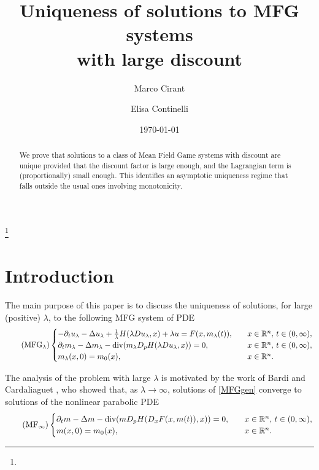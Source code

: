 \documentclass{amsart}
\theoremstyle{remark}
\theoremstyle{definition}
\theoremstyle{Claim}
\theoremstyle{plain}
\begin{document}
\title[]{Uniqueness of solutions to MFG systems \\ with large discount}

\author{Marco Cirant}
\address{Dipartimento di Matematica ``Tullio Levi-Civita'', Universit\`a degli Studi di Padova, 
via Trieste 63, 35121 Padova (Italy)}
\curraddr{}
\thanks{}
\author{Elisa Continelli}
\address{Dipartimento di Matematica ``Tullio Levi-Civita'', Universit\`a degli Studi di Padova, 
via Trieste 63, 35121 Padova (Italy)}
\curraddr{}

\date{\today}

\begin{abstract} We prove that solutions to a class of Mean Field Game systems with discount are unique provided that the discount factor is large enough, and the Lagrangian term is (proportionally) small enough. This identifies an asymptotic uniqueness regime that falls outside the usual ones involving monotonicity.
\end{abstract}

\maketitle


\section{Introduction}

	The main purpose of this paper is to discuss the uniqueness of solutions, for large (positive) $\lambda$, to the following MFG system of PDE
	\begin{equation}\label{MFGgen}\tag{${\rm MFG}_\lambda$}
		\begin{cases}
			-\partial_t u_\lambda-\Delta u_\lambda+\frac{1}{\lambda}H(\lambda Du_\lambda,x)+\lambda u=F(x,m_\lambda(t)),\quad &x\in \mathbb{R}^n,\,t\in (0,\infty),\\
			\partial_t m_\lambda-\Delta m_\lambda-\text{div}(m_\lambda D_pH(\lambda Du_\lambda,x))=0,\quad &x\in \mathbb{R}^n,\,t\in (0,\infty),\\
			m_\lambda(x,0)=m_0(x),\quad &x\in \mathbb{R}^n. %
		\end{cases}
	\end{equation}
	
	The analysis of the problem with large $\lambda$ is motivated by the work of Bardi and Cardaliaguet \cite{BC}, who showed that, as $\lambda \to \infty$, solutions of \eqref{MFGgen} converge to solutions of the nonlinear parabolic PDE
	\begin{equation}\label{MFGlim}\tag{${\rm MF}_\infty$}
		\begin{cases}
			\partial_t m-\Delta m-\text{div}(mD_pH(D_x F(x,m(t)),x))=0,\quad &x\in \mathbb{R}^n,\,t\in (0,\infty),\\
			m(x,0)=m_0(x),\quad &x\in \mathbb{R}^n. %
		\end{cases}
	\end{equation}
	
\end{document}
